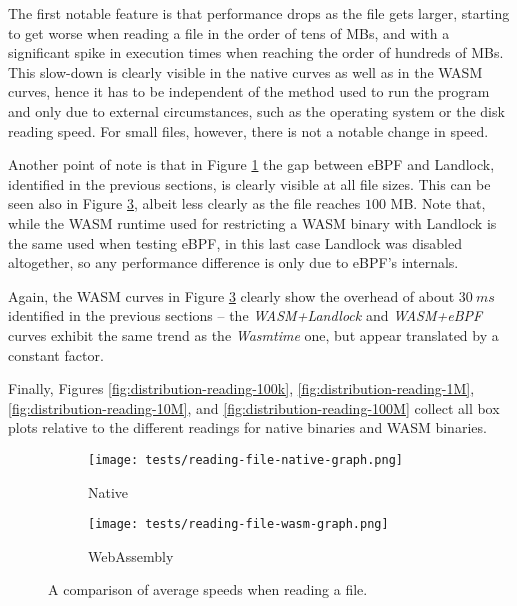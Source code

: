 The first notable feature is that performance drops as the file gets larger,
starting to get worse when reading a file in the order of tens of MBs, and with a significant
spike in execution times when reaching the order of hundreds of MBs.
This slow-down is clearly visible in the native curves as well as in the WASM curves,
hence it has to be independent of the method used to run the
program and only due to external circumstances, such as the operating system or the disk reading speed.
For small files, however, there is not a notable change in speed.

Another point of note is that in Figure \ref{fig:avg-comparison-native-speed} the gap between eBPF and Landlock,
identified in the previous sections, is clearly visible at all file sizes.
This can be seen also in Figure \ref{fig:avg-comparison-wasm-speed}, albeit less clearly as the file reaches $100$ MB.
Note that, while the WASM runtime used for restricting a WASM binary with Landlock is the same used when testing eBPF,
in this last case Landlock was disabled altogether, so any performance difference is only due to eBPF's internals.

Again, the WASM curves in Figure \ref{fig:avg-comparison-wasm-speed} clearly show the overhead
of about $30\ ms$ identified in the previous sections -- the \textit{WASM+Landlock} and \textit{WASM+eBPF} curves
exhibit the same trend as the \textit{Wasmtime} one, but appear translated by a constant factor.

Finally, Figures \ref{fig:distribution-reading-100k}, \ref{fig:distribution-reading-1M}, \ref{fig:distribution-reading-10M},
and \ref{fig:distribution-reading-100M} collect all box plots relative to the different readings for
native binaries and WASM binaries.

\begin{figure}[ht!]
  \centering

  \begin{subfigure}[b]{0.49\linewidth}
    \centering
    \texttt{[image: tests/reading-file-native-graph.png]}
    \caption{Native}
    \label{fig:avg-comparison-native-speed}
  \end{subfigure}
  \begin{subfigure}[b]{0.49\linewidth}
    \centering
    \texttt{[image: tests/reading-file-wasm-graph.png]}
    \caption{WebAssembly}
    \label{fig:avg-comparison-wasm-speed}
  \end{subfigure}

  \caption{A comparison of average speeds when reading a file.}
\end{figure}

